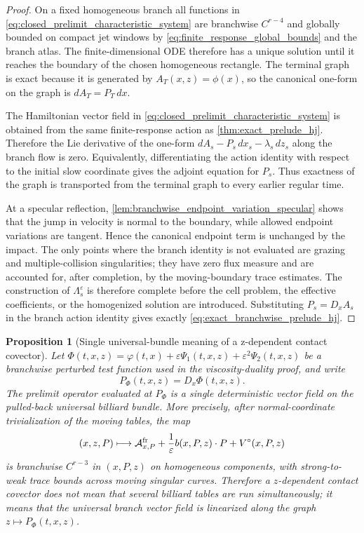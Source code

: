\documentclass[12pt, letterpaper]{amsart}
\newcommand{\Acal}{\mathcal{A}}
\theoremstyle{plain}
\newtheorem{proposition}[theorem]{Proposition}
\theoremstyle{definition}
\theoremstyle{remark}
\begin{document}
\begin{proof}
On a fixed homogeneous branch all functions in
\eqref{eq:closed_prelimit_characteristic_system} are branchwise \(C^{r-4}\) and
globally bounded on compact jet windows by \cref{eq:finite_response_global_bounds}
and the branch atlas.  The finite-dimensional ODE therefore has a unique
solution until it reaches the boundary of the chosen homogeneous rectangle.  The
terminal graph is exact because it is generated by \(A_T(x,z)=\phi(x)\), so the
canonical one-form on the graph is \(dA_T=P_T\,dx\).

The Hamiltonian vector field in
\eqref{eq:closed_prelimit_characteristic_system} is obtained from the same
finite-response action as \cref{thm:exact_prelude_hj}.  Therefore the Lie
derivative of the one-form \(dA_s-P_s\,dx_s-\lambda_s\,dz_s\) along the branch
flow is zero.  Equivalently, differentiating the action identity with respect to
the initial slow coordinate gives the adjoint equation for \(P_s\).  Thus exactness
of the graph is transported from the terminal graph to every earlier regular
time.

At a specular reflection, \cref{lem:branchwise_endpoint_variation_specular}
shows that the jump in velocity is normal to the boundary, while allowed
endpoint variations are tangent.  Hence the canonical endpoint term is unchanged
by the impact.  The only points where the branch identity is not evaluated are
grazing and multiple-collision singularities; they have zero flux measure and are
accounted for, after completion, by the moving-boundary trace estimates.  The
construction of \(\Lambda_s^\varepsilon\) is therefore complete before the cell
problem, the effective coefficients, or the homogenized solution are introduced.
Substituting \(P_s=D_xA_s\) in the branch action identity gives exactly
\eqref{eq:exact_branchwise_prelude_hj}.
\end{proof}


\begin{proposition}[Single universal-bundle meaning of a z-dependent contact covector]
\label{prop:z_dependent_contact_covector_universal_bundle}
Let \(\Phi(t,x,z)=\varphi(t,x)+\varepsilon\Psi_1(t,x,z)+\varepsilon^2\Psi_2(t,x,z)\)
be a branchwise perturbed test function used in the viscosity-duality proof,
and write
\begin{equation}
    P_\Phi(t,x,z)=D_x\Phi(t,x,z).
\end{equation}
The prelimit operator evaluated at \(P_\Phi\) is a single deterministic vector
field on the pulled-back universal billiard bundle.  More precisely, after
normal-coordinate trivialization of the moving tables, the map
\begin{equation}
    (x,z,P)\longmapsto
    \Acal^{\rm fr}_{x,P}+\frac1\varepsilon b(x,P,z)\cdot P+V^\circ(x,P,z)
\end{equation}
is branchwise \(C^{r-3}\) in \((x,P,z)\) on homogeneous components, with
strong-to-weak trace bounds across moving singular curves.  Therefore a
\(z\)-dependent contact covector does not mean that several billiard tables are
run simultaneously; it means that the universal branch vector field is
linearized along the graph \(z\mapsto P_\Phi(t,x,z)\).
\end{proposition}
\end{document}
